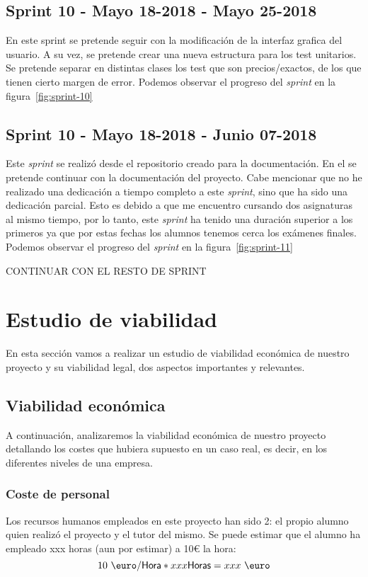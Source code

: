 \subsection{Sprint 10 - Mayo 18-2018 - Mayo 25-2018}
En este sprint se pretende seguir con la modificación de la interfaz grafica del usuario. 
A su vez, se pretende crear una nueva estructura para los test unitarios. Se pretende separar en distintas clases los test que son precios/exactos, de los que tienen cierto margen de error. 
Podemos observar el progreso del \textit{sprint} en la figura~\ref{fig:sprint-10}
\subsection{Sprint 10 - Mayo 18-2018 - Junio 07-2018}
Este \textit{sprint} se realizó desde el repositorio creado para la documentación. En el se pretende continuar con la documentación del proyecto.
Cabe mencionar que no he realizado una dedicación a tiempo completo a este \textit{sprint}, sino que ha sido una dedicación parcial. Esto es debido a que me encuentro cursando dos asignaturas al mismo tiempo, por lo tanto, este \textit{sprint} ha tenido una duración superior a los primeros ya que por estas fechas los alumnos tenemos cerca los exámenes finales.
Podemos observar el progreso del \textit{sprint} en la figura~\ref{fig:sprint-11}

CONTINUAR CON EL RESTO DE SPRINT
\section{Estudio de viabilidad}
En esta sección vamos a realizar un estudio de viabilidad económica de nuestro proyecto y su viabilidad legal, dos aspectos importantes y relevantes.
\subsection{Viabilidad económica}
A continuación, analizaremos la viabilidad económica de nuestro proyecto detallando los costes que hubiera supuesto en un caso real, es decir,  en los diferentes niveles de una empresa.
\subsubsection{Coste de personal}
Los recursos humanos empleados en este proyecto han sido 2: el propio alumno quien realizó el proyecto y el tutor del mismo. Se puede estimar que el alumno ha empleado xxx horas (aun por estimar) a 10\euro{} la hora:
\[10~{\mbox{\euro}} /\textsf{Hora}*xxx\textsf{Horas}=xxx~{\mbox{\euro}} \]

